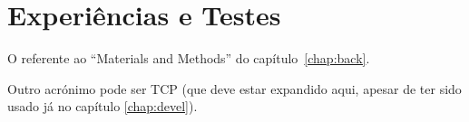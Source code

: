 \chapter{Experiências e Testes}\label{chap:tests}

O referente ao ``Materials and Methods'' do capítulo~\ref{chap:back}.

Outro acrónimo pode ser \ac{TCP} (que deve estar expandido aqui, apesar de ter sido usado já no capítulo \ref{chap:devel}).

